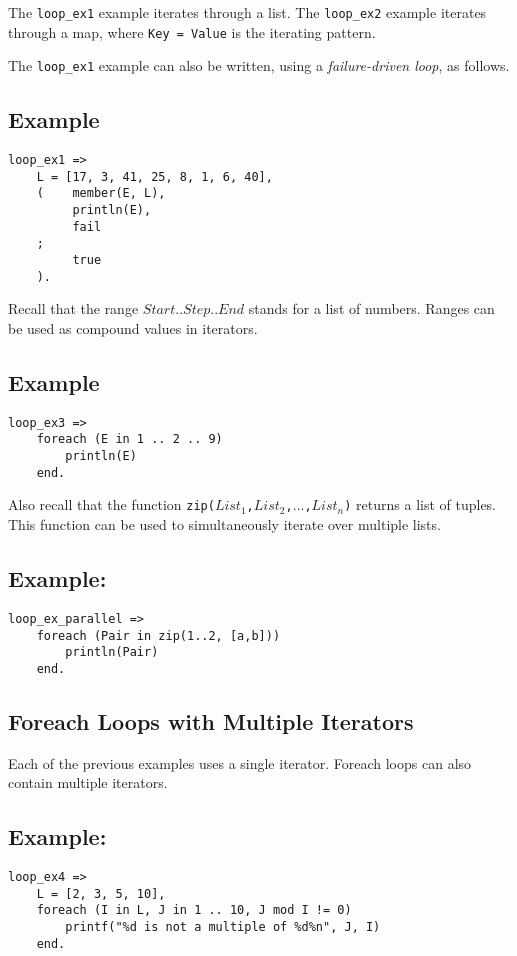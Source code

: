 The \texttt{loop\_ex1} example iterates through a list.  The \texttt{loop\_ex2} example iterates through a map, where \texttt{Key = Value} is the iterating pattern.

The \texttt{loop\_ex1} example can also be written, using a \emph{failure-driven loop}, as follows.

\subsection*{Example}
\begin{verbatim}
loop_ex1 =>
    L = [17, 3, 41, 25, 8, 1, 6, 40],
    (    member(E, L),
         println(E),
         fail
    ;
         true
    ).
\end{verbatim}


Recall that the range $Start .. Step .. End$ stands for a list of numbers.  Ranges can be used as compound values in iterators.
\subsection*{Example}
\begin{verbatim}
loop_ex3 =>
    foreach (E in 1 .. 2 .. 9)
        println(E)
    end.
\end{verbatim}

Also recall that the function \texttt{zip($List_1$,$List_2$,$\ldots$,$List_n$)} returns a list of tuples. This function can be used to simultaneously iterate over multiple lists.

\subsection*{Example:}
\begin{verbatim}
loop_ex_parallel =>
    foreach (Pair in zip(1..2, [a,b]))
        println(Pair)
    end.
\end{verbatim}


\subsection{Foreach Loops with Multiple Iterators}
Each of the previous examples uses a single iterator.  Foreach loops can also contain multiple iterators.
\subsection*{Example:}
\begin{verbatim}
loop_ex4 =>
    L = [2, 3, 5, 10],
    foreach (I in L, J in 1 .. 10, J mod I != 0)
        printf("%d is not a multiple of %d%n", J, I)
    end.
\end{verbatim}


